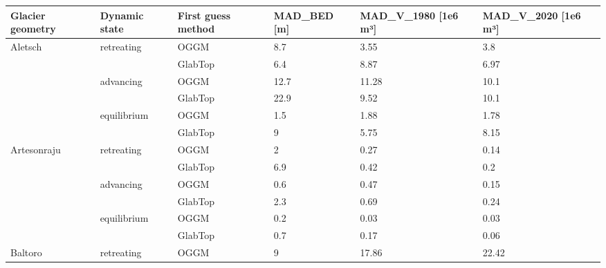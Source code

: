 \documentclass[journal abbreviation, manuscript]{copernicus}
\begin{document}
\begin{table}[]
\begin{tabular}{@{}llllll@{}}
\toprule
Glacier geometry & Dynamic state & First guess method & MAD\_BED {[}m{]} & MAD\_V\_1980 {[}1e6 m³{]} & MAD\_V\_2020 {[}1e6 m³{]} \\ \midrule
Aletsch          & retreating    & OGGM               & 8.7              & 3.55                      & 3.8                       \\
                 &               & GlabTop            & 6.4              & 8.87                      & 6.97                      \\ \cmidrule(l){2-6} 
                 & advancing     & OGGM               & 12.7             & 11.28                     & 10.1                      \\
                 &               & GlabTop            & 22.9             & 9.52                      & 10.1                      \\ \cmidrule(l){2-6} 
                 & equilibrium   & OGGM               & 1.5              & 1.88                      & 1.78                      \\
                 &               & GlabTop            & 9                & 5.75                      & 8.15                      \\ \midrule
Artesonraju      & retreating    & OGGM               & 2                & 0.27                      & 0.14                      \\
                 &               & GlabTop            & 6.9              & 0.42                      & 0.2                       \\ \cmidrule(l){2-6} 
                 & advancing     & OGGM               & 0.6              & 0.47                      & 0.15                      \\
                 &               & GlabTop            & 2.3              & 0.69                      & 0.24                      \\ \cmidrule(l){2-6} 
                 & equilibrium   & OGGM               & 0.2              & 0.03                      & 0.03                      \\
                 &               & GlabTop            & 0.7              & 0.17                      & 0.06                      \\ \midrule
Baltoro          & retreating    & OGGM               & 9                & 17.86                     & 22.42                     \\

\end{tabular}
\end{table}
\end{document}
